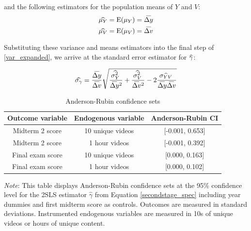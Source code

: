 \documentclass[12pt]{article}
\newcommand\wh[1]{\hstretch{2}{\hat{\hstretch{.5}{#1}}}}
\newcommand\wb[1]{\hstretch{2}{\bar{\hstretch{.5}{#1}}}}
\newcommand{\Fignote}[1]{
	\begin{tablenotes}[para,flushleft]\footnotesize
		\textit{Note}: #1
	\end{tablenotes}
}
\begin{document}
and the following estimators for the population means of $Y$ and $V$:
\begin{equation}
\begin{split}
\wh{\mu_Y} & = \operatorname{E}(\mu_Y) = \wb{\Delta y} \\
\wh{\mu_V} & = \operatorname{E}(\mu_V) = \wb{\Delta v}
\end{split}
\end{equation}

Substituting these variance and means estimators into the final step of \ref{var_expanded}, we arrive at the standard error estimator for $\wh{\gamma}$:

\begin{equation}
	\wh{\sigma_{\gamma}} = \frac{\wb{\Delta y}}{\wb{\Delta v}} \sqrt{ \frac{\wh{\sigma_Y^2}}{\wb{\Delta y}^2} + \frac{\wh{\sigma_V^2}}{\wb{\Delta v}^2} - 2 \frac{\wh{\sigma_{YV}}}{\wb{\Delta y} \wb{\Delta v}} }
\end{equation}

\clearpage


\clearpage


\clearpage
\begin{spacing}{1.0}
\begin{table} \centering \caption{Anderson-Rubin confidence sets}
\label{arci_table}
\begin{threeparttable}
\begin{tabular}{ ccc }
\toprule
Outcome variable & Endogenous variable & Anderson-Rubin CI \\
\midrule
Midterm 2 score & 10 unique videos & [-0.001, 0.653] \\
Midterm 2 score & 1 hour videos & [-0.001, 0.392] \\
Final exam score & 10 unique videos & [0.000, 0.163] \\
Final exam score & 1 hour videos & [0.000, 0.102] \\
\bottomrule
\end{tabular}
\Fignote{This table displays Anderson-Rubin confidence sets at the 95\% confidence level for the 2SLS estimator $\hat{\gamma}$ from Equation \ref{secondstage_spec} including year dummies and first midterm score as controls. Outcomes are measured in standard deviations. Instrumented endogenous variables are measured in 10s of unique videos or hours of unique content.}
\end{threeparttable}
\end{table}
\end{spacing}
\end{document}

